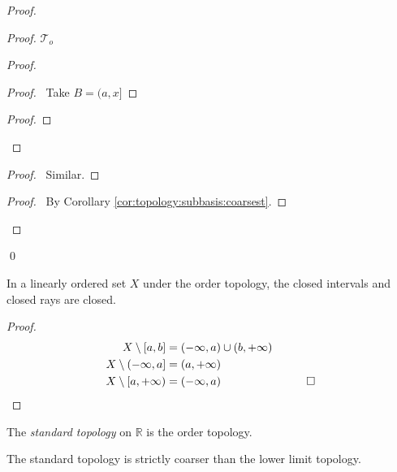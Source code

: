 \begin{proof}
\begin{proof}
{      $\mathcal{T}_o$}
    \begin{proof}
      \begin{proof}
        \pf\ Take $B = (a, x]$
      \end{proof}
      \begin{proof}
      \end{proof}
    \end{proof}
    \begin{proof}
      \pf\ Similar.
    \end{proof}
    \qedstep
    \begin{proof}
      \pf\ By Corollary \ref{cor:topology:subbasis:coarsest}.
    \end{proof}
  \end{proof}
  \qed
\end{proof}

\begin{lm}
  In a linearly ordered set $X$ under the order topology, the closed
  intervals
  and closed rays are closed.
\end{lm}

\begin{proof}
  \pf
  \begin{align*}
    X \setminus [a, b] & = (-\infty, a) \cup (b, +\infty) \\
    X \setminus (-\infty, a] & = (a, +\infty) \\
    X \setminus {[}a, +\infty) & = (-\infty, a) & \qed
  \end{align*}
\end{proof}

\begin{df}
  The \emph{standard topology} on $\mathbb{R}$ is the order topology.
\end{df}

\begin{lm}
  The standard topology is strictly coarser than the lower limit topology.
\end{lm}

